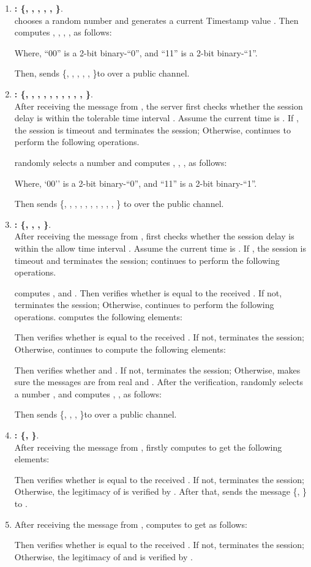 \documentclass[preprint,12pt]{elsarticle}
\begin{document}
\begin{enumerate}[Step 1:]
\item \textbf{  : \{, , , , , \}}.\\
 chooses a random number  and generates a current Timestamp value . Then  computes , , , ,  as follows:

Where, ``00'' is a 2-bit binary-``0'', and ``11'' is a 2-bit binary-``1''.

Then,  sends \{, , , , , \}to  over a public channel.

\item \textbf{  : \{, , , , , , , , , , \}}.\\
After receiving the message from , the server  first checks whether the session delay is within the tolerable time interval . Assume the current time is . If , the session is timeout and  terminates the session; Otherwise,  continues to perform the following operations.

 randomly selects a number  and computes , , ,  as follows:

Where, `00'' is a 2-bit binary-``0'', and ``11'' is a 2-bit binary-``1''.

Then  sends \{, , , , , , , , , , \} to  over the public channel.

\item \textbf{  : \{, , ,  \}}.\\
After receiving the message from ,  first checks whether the session delay is within the allow time interval . Assume the current time is . If , the session is timeout and  terminates the session;  continues to perform the following operations.

 computes ,  and .  Then  verifies whether  is equal to the received . If not,  terminates the session; Otherwise,  continues to perform the following operations.  computes the following elements:

Then  verifies whether  is equal to the received . If not,  terminates the session; Otherwise,  continues to compute the following elements:

Then  verifies whether  and . If not,  terminates the session; Otherwise,   makes sure the messages are from real  and . After the verification,  randomly selects a number , and computes , ,   as follows:

Then  sends \{, , ,  \}to  over a public channel.

\item \textbf{  : \{, \}}.\\
After receiving the message from ,  firstly computes to get the following elements:

Then  verifies whether  is equal to the received . If not,  terminates the session; Otherwise, the legitimacy of  is verified by . After that,  sends the message \{, \} to .

\item
After receiving the message from ,  computes to get  as follows:

Then  verifies whether  is equal to the received . If not,  terminates the session; Otherwise, the legitimacy of  and  is verified by .

\end{enumerate}
\end{document}
